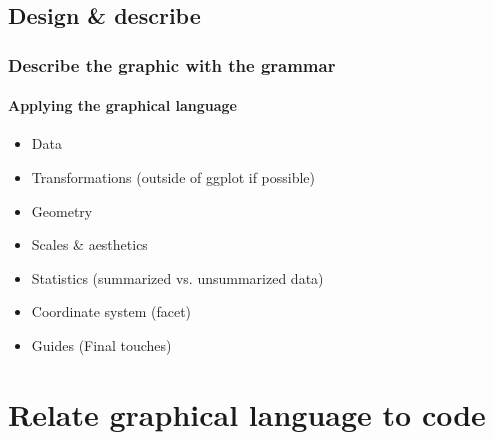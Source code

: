 \documentclass{beamer}
\begin{document}
\subsection{Design \& describe}


\begin{frame}\frametitle{Describe the graphic with the grammar}
\framesubtitle{Applying the graphical language}
	\begin{itemize}	
	\item \alert{Data} 
	\item Transformations (outside of ggplot if possible)
	\item \alert{Geometry} 
	\item \alert{Scales \& aesthetics}
	\item Statistics (summarized vs. unsummarized data)
	\item \alert{Coordinate system} (facet)
	\item Guides (Final touches)
	\end{itemize}
\end{frame}
		

\section{Relate graphical language to code}
\end{document}
